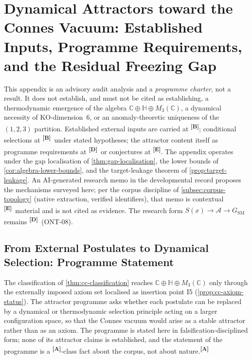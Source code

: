 \documentclass[12pt,a4paper,twoside]{article}
\theoremstyle{plain}
\theoremstyle{definition}
\theoremstyle{remark}
\newcommand{\catmark}[1]{\textsuperscript{\textsf{\textbf{[#1]}}}}
\begin{document}
\section{Dynamical Attractors toward the Connes Vacuum: Established Inputs, Programme Requirements, and the Residual Freezing Gap}
\label{app:connes-attractor}

\begin{governancebox}
This appendix is an advisory audit analysis and a \emph{programme charter},
not a result. It does not establish, and must not be cited as establishing,
a thermodynamic emergence of the algebra
$\mathbb{C}\oplus\mathbb{H}\oplus M_3(\mathbb{C})$, a dynamical necessity of
KO-dimension~6, or an anomaly-theoretic uniqueness of the $(1,2,3)$
partition. Established external inputs are carried at \catmark{B};
conditional selections at \catmark{B}\ under stated hypotheses; the
attractor content itself as programme requirements at \catmark{D}\ or
conjectures at \catmark{E}. The appendix operates under the gap
localisation of \cref{thm:gap-localisation}, the lower bounds of
\cref{cor:algebra-lower-bounds}, and the target-leakage theorem of
\cref{prop:target-leakage}. An AI-generated research memo in the
developmental record proposes the mechanisms surveyed here; per the corpus
discipline of \cref{subsec:corpus-topology} (native extraction, verified
identifiers), that memo is contextual \catmark{E}\ material and is not
cited as evidence. The research form
$S(x)\to\mathcal{A}\to G_{\mathrm{SM}}$ remains \catmark{D}\ (ONT-08).
\end{governancebox}

\subsection{From External Postulates to Dynamical Selection: Programme Statement}
\label{app:b-programme}

The classification of \cref{thm:cc-classification} reaches
$\mathbb{C}\oplus\mathbb{H}\oplus M_3(\mathbb{C})$ only through the
externally imposed axiom set localised as insertion point I5
(\cref{prop:cc-axiom-status}). The attractor programme asks whether each
postulate can be replaced by a dynamical or thermodynamic selection
principle acting on a larger configuration space, so that the Connes
vacuum would arise as a stable attractor rather than as an axiom. The
programme is stated here in falsification-disciplined form; none of its
attractor claims is established, and the statement of the programme is a
\catmark{A}-class fact about the corpus, not about nature.\catmark{A}
\end{document}
